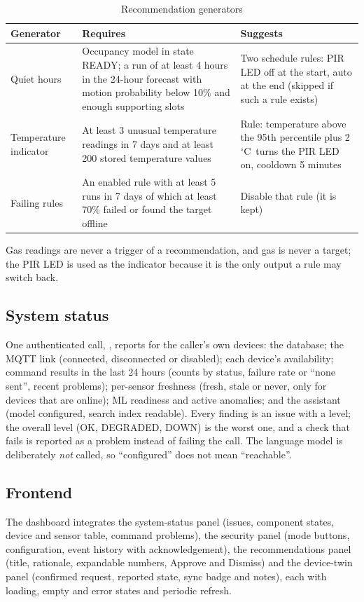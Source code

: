 \documentclass[12pt,a4paper,oneside]{report}
\newcommand{\api}[1]{\path{#1}}
\newcommand{\degC}{$^{\circ}$C}
\begin{document}
\begin{table}[H]
\centering
\caption{Recommendation generators}
\label{tab:recs}
\begin{tabularx}{\textwidth}{lXX}
\toprule
\textbf{Generator} & \textbf{Requires} & \textbf{Suggests}\\
\midrule
Quiet hours & Occupancy model in state READY; a run of at least 4 hours in the 24-hour forecast with motion probability below 10\% and enough supporting slots & Two schedule rules: PIR LED off at the start, auto at the end (skipped if such a rule exists)\\
Temperature indicator & At least 3 unusual temperature readings in 7 days and at least 200 stored temperature values & Rule: temperature above the 95th percentile plus 2\,\degC\ turns the PIR LED on, cooldown 5 minutes\\
Failing rules & An enabled rule with at least 5 runs in 7 days of which at least 70\% failed or found the target offline & Disable that rule (it is kept)\\
\bottomrule
\end{tabularx}
\end{table}
Gas readings are never a trigger of a recommendation, and gas is never a target; the PIR LED is used as the indicator because it is the only output a rule may switch back.

\subsection{System status}
One authenticated call, \api{/api/system/status}, reports for the caller's own devices: the database; the MQTT link (connected, disconnected or disabled); each device's availability; command results in the last 24 hours (counts by status, failure rate or ``none sent'', recent problems); per-sensor freshness (fresh, stale or never, only for devices that are online); ML readiness and active anomalies; and the assistant (model configured, search index readable). Every finding is an issue with a level; the overall level (OK, DEGRADED, DOWN) is the worst one, and a check that fails is reported as a problem instead of failing the call. The language model is deliberately \emph{not} called, so ``configured'' does not mean ``reachable''.

\subsection{Frontend}
The dashboard integrates the system-status panel (issues, component states, device and sensor table, command problems), the security panel (mode buttons, configuration, event history with acknowledgement), the recommendations panel (title, rationale, expandable numbers, Approve and Dismiss) and the device-twin panel (confirmed request, reported state, sync badge and notes), each with loading, empty and error states and periodic refresh.
\end{document}

